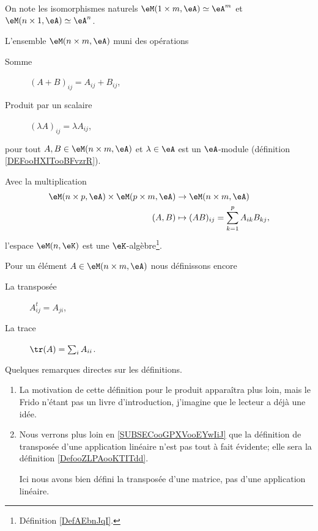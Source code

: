 \begin{normaltext}
    On note les isomorphismes naturels \( \eM(1\times m,\eA) \simeq \eA^m\) et \( \eM(n\times 1,\eA) \simeq \eA^n\).
\end{normaltext}

\begin{lemmaDef}
    L'ensemble \( \eM(n\times m, \eA)\) muni des opérations
    \begin{description}
        \item[Somme] \( (A+B)_{ij}=A_{ij}+B_{ij}\),
        \item[Produit par un scalaire] \( (\lambda A)_{ij}=\lambda A_{ij}\),
    \end{description}
    pour tout \( A,B\in \eM(n\times m,\eA ) \) et \( \lambda\in \eA \) est un \( \eA\)-module (définition \ref{DEFooHXITooBFvzrR}).
\end{lemmaDef}

\begin{lemmaDef}
    Avec la multiplication
    \begin{equation}
        \begin{aligned}
             \eM(n\times p,\eA)\times \eM(p\times m,\eA)&\to \eM(n\times m,\eA) \\
             (A,B)&\mapsto (AB)_{ij}=\sum_{k=1}^pA_{ik}B_{kj},
        \end{aligned}
    \end{equation}
    l'espace \( \eM(n,\eK)\) est une \( \eK\)-algèbre\footnote{Définition \ref{DefAEbnJqI}.}.
\end{lemmaDef}

\begin{definition}
    Pour un élément \( A\in \eM(n\times m, \eA)\) nous définissons encore
    \begin{description}
        \item[La transposée] \( A^t_{ij}=A_{ji}\),
        \item[La trace] \( \tr(A)=\sum_iA_{ii}\).
    \end{description}
\end{definition}


\begin{remark}
    Quelques remarques directes sur les définitions.
    \begin{enumerate}
        \item
            La motivation de cette définition pour le produit apparaîtra plus loin, mais le Frido n'étant pas un livre d'introduction, j'imagine que le lecteur a déjà une idée.
        \item
            Nous verrons plus loin en \ref{SUBSECooGPXVooEYwIiJ} que la définition de transposée d'une application linéaire n'est pas tout à fait évidente; elle sera la définition \ref{DefooZLPAooKTITdd}.

            Ici nous avons bien défini la transposée d'une matrice, pas d'une application linéaire.
    \end{enumerate}
\end{remark}


